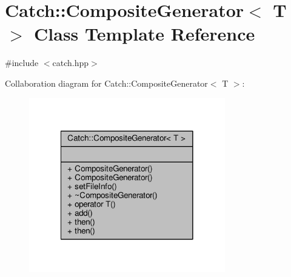 \hypertarget{class_catch_1_1_composite_generator}{\section{Catch\-:\-:Composite\-Generator$<$ T $>$ Class Template Reference}
\label{class_catch_1_1_composite_generator}
}


{\ttfamily \#include $<$catch.\-hpp$>$}



Collaboration diagram for Catch\-:\-:Composite\-Generator$<$ T $>$\-:
\nopagebreak
\begin{figure}[H]
\begin{center}
\leavevmode
\includegraphics[width=242pt]{class_catch_1_1_composite_generator__coll__graph}
\end{center}
\end{figure}
